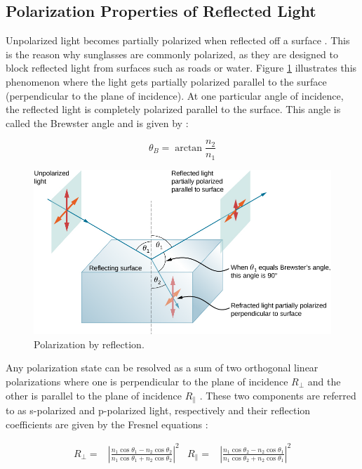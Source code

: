 \subsection{Polarization Properties of Reflected Light}
Unpolarized light becomes partially polarized when reflected off a surface \cite[34]{lingUniversityPhysicsVolume2016}.
This is the reason why sunglasses are commonly polarized, as they are designed to block reflected light from surfaces such as roads or water.
Figure \ref{fig:polarized_reflection} illustrates this phenomenon where the light gets partially polarized parallel to the surface (perpendicular to the plane of incidence).
At one particular angle of incidence, the reflected light is completely polarized parallel to the surface.
This angle is called the Brewster angle and is given by \cite{BrewsterAngle2024}:

\begin{equation}
    \theta_B = \arctan{\frac{n_2}{n_1}}
\end{equation}

\begin{figure}[H]
    \centering
    \includegraphics[width=.8\linewidth]{figures/polarization/reflaction.png}
    \caption{Polarization by reflection. \cite[Figure 1.38]{lingUniversityPhysicsVolume2016}}
    \label{fig:polarized_reflection}
\end{figure}


Any polarization state can be resolved as a sum of two orthogonal linear polarizations where one is perpendicular to the plane of incidence $R_\perp$ and the other is parallel to the plane of incidence $R_\parallel$ \cite{FresnelEquations2024}.
These two components are referred to as s-polarized and p-polarized light, respectively and their reflection coefficients are given by the Fresnel equations \cite{FresnelEquations2024}:

\begin{align}
    R_\perp =         & \left|{\frac {n_{1}\cos \theta _1-n_{2}\cos \theta _2}{n_{1}\cos \theta _1+n_{2}\cos \theta _2}}\right|^{2}
                      &
    R_\parallel     = & \left|{\frac {n_{1}\cos \theta _2-n_{2}\cos \theta _1}{n_{1}\cos \theta _2+n_{2}\cos \theta _1}}\right|^{2}
\end{align}

